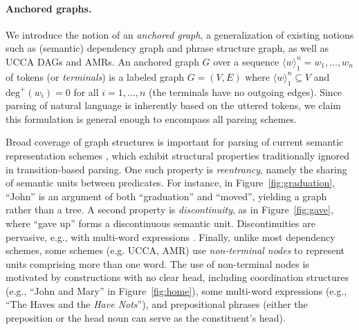\documentclass[11pt,a4paper]{article}
\newcommand{\figref}[1]{Figure~\ref{#1}}
\begin{document}
\paragraph{Anchored graphs.}
We introduce the notion of an \textit{anchored graph},
a generalization of existing notions such as (semantic) dependency graph and phrase structure graph,
as well as UCCA DAGs and AMRs.
An anchored graph $G$ over a sequence $\langle w\rangle_1^n=w_1, \ldots, w_n$ of tokens
(or \textit{terminals}) is a labeled graph $G=(V,E)$ where $\langle w\rangle_1^n \subseteq V$ and
$\mathrm{deg}^+(w_i) = 0$ for all $i=1,\ldots,n$ (the terminals have no outgoing edges).
Since parsing of natural language is inherently based on the uttered tokens,
we claim this formulation is general enough to encompass all parsing schemes.

Broad coverage of graph structures is important for parsing of current semantic representation schemes
\cite{abend2017the}, which exhibit structural properties traditionally ignored in transition-based
parsing.
One such property is \textit{reentrancy},
namely the sharing of semantic units between predicates.
For instance, in \figref{fig:graduation},
``John'' is an argument of both ``graduation''
and ``moved'', yielding a graph rather than a tree.
A second property is \textit{discontinuity},
as in \figref{fig:gave}, where ``gave up'' forms a discontinuous semantic unit.
Discontinuities are pervasive, e.g.,  with multi-word
expressions \cite{schneider2014discriminative}.
Finally, unlike most dependency schemes, some schemes (e.g. UCCA, AMR) use \textit{non-terminal nodes}
to represent units comprising more than one word.
The use of non-terminal nodes is motivated by constructions with no clear head, including
coordination structures (e.g., ``John and Mary'' in \figref{fig:home}),
some multi-word expressions (e.g., ``The Haves and the \textit{Have Nots}''),
and prepositional phrases (either the preposition or the head noun can serve as the constituent's head).
\end{document}
